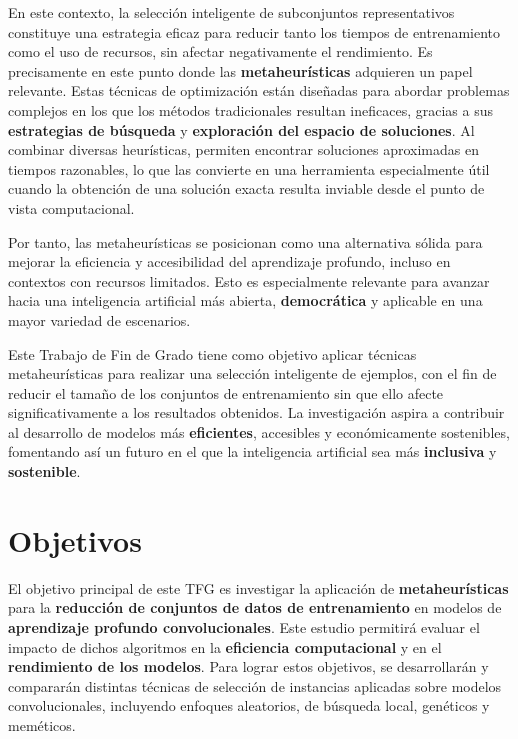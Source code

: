 En este contexto, la selección inteligente de subconjuntos representativos constituye una estrategia eficaz para reducir tanto
los tiempos de entrenamiento como el uso de recursos, sin afectar negativamente el rendimiento.
Es precisamente en este punto donde las \textbf{metaheurísticas} adquieren un papel relevante.
Estas técnicas de optimización están diseñadas para abordar problemas complejos en los que los métodos tradicionales
resultan ineficaces, gracias a sus \textbf{estrategias de búsqueda} y \textbf{exploración del espacio de soluciones}.
Al combinar diversas heurísticas, permiten encontrar soluciones aproximadas en tiempos razonables, lo que las convierte
en una herramienta especialmente útil cuando la obtención de una solución exacta resulta inviable desde el punto de
vista computacional.


Por tanto, las metaheurísticas se posicionan como una alternativa sólida para mejorar la eficiencia y accesibilidad del
aprendizaje profundo, incluso en contextos con recursos limitados.
Esto es especialmente relevante para avanzar hacia una inteligencia artificial más abierta, \textbf{democrática} y aplicable
en una mayor variedad de escenarios.


Este Trabajo de Fin de Grado tiene como objetivo aplicar técnicas metaheurísticas para realizar una selección
inteligente de ejemplos, con el fin de reducir el tamaño de los conjuntos de entrenamiento sin que ello afecte
significativamente a los resultados obtenidos.
La investigación aspira a contribuir al desarrollo de modelos más \textbf{eficientes}, accesibles y económicamente
sostenibles, fomentando así un futuro en el que la inteligencia artificial sea más \textbf{inclusiva} y
\textbf{sostenible}.


\section{Objetivos}\label{sec:objetivos}
El objetivo principal de este TFG es investigar la aplicación de \textbf{metaheurísticas} para la
\textbf{reducción de conjuntos de datos de entrenamiento} en modelos de \textbf{aprendizaje profundo convolucionales}.
Este estudio permitirá evaluar el impacto de dichos algoritmos en la \textbf{eficiencia computacional} y en el
\textbf{rendimiento de los modelos}.
Para lograr estos objetivos, se desarrollarán y compararán distintas técnicas de selección de instancias aplicadas
sobre modelos convolucionales, incluyendo enfoques aleatorios, de búsqueda local, genéticos y meméticos.


